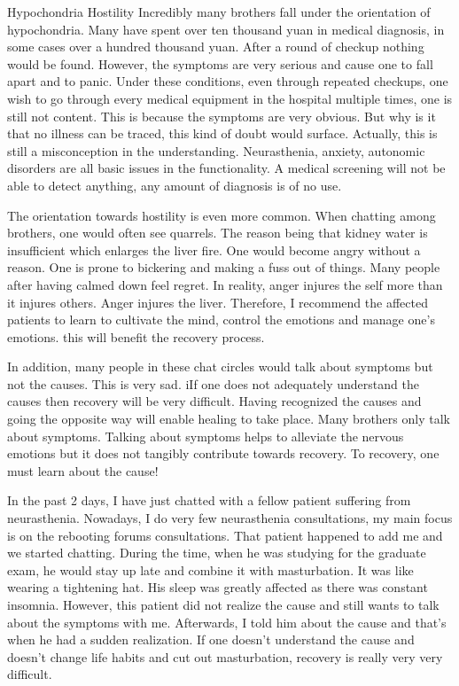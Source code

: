 \documentclass[
]{book}
\begin{document}
Hypochondria
Hostility
Incredibly many brothers fall under the orientation of hypochondria. Many have spent over ten thousand yuan in medical diagnosis, in some cases over a hundred thousand yuan. After a round of checkup nothing would be found. However, the symptoms are very serious and cause one to fall apart and to panic. Under these conditions, even through repeated checkups, one wish to go through every medical equipment in the hospital multiple times, one is still not content. This is because the symptoms are very obvious. But why is it that no illness can be traced, this kind of doubt would surface. Actually, this is still a misconception in the understanding. Neurasthenia, anxiety, autonomic disorders are all basic issues in the functionality. A medical screening will not be able to detect anything, any amount of diagnosis is of no use.

The orientation towards hostility is even more common. When chatting among brothers, one would often see quarrels. The reason being that kidney water is insufficient which enlarges the liver fire. One would become angry without a reason. One is prone to bickering and making a fuss out of things. Many people after having calmed down feel regret. In reality, anger injures the self more than it injures others. Anger injures the liver. Therefore, I recommend the affected patients to learn to cultivate the mind, control the emotions and manage one's emotions. this will benefit the recovery process.

In addition, many people in these chat circles would talk about symptoms but not the causes. This is very sad. iIf one does not adequately understand the causes then recovery will be very difficult. Having recognized the causes and going the opposite way will enable healing to take place. Many brothers only talk about symptoms. Talking about symptoms helps to alleviate the nervous emotions but it does not tangibly contribute towards recovery. To recovery, one must learn about the cause!

In the past 2 days, I have just chatted with a fellow patient suffering from neurasthenia. Nowadays, I do very few neurasthenia consultations, my main focus is on the rebooting forums consultations. That patient happened to add me and we started chatting. During the time, when he was studying for the graduate exam, he would stay up late and combine it with masturbation. It was like wearing a tightening hat. His sleep was greatly affected as there was constant insomnia. However, this patient did not realize the cause and still wants to talk about the symptoms with me. Afterwards, I told him about the cause and that's when he had a sudden realization. If one doesn't understand the cause and doesn't change life habits and cut out masturbation, recovery is really very very difficult.
\end{document}
